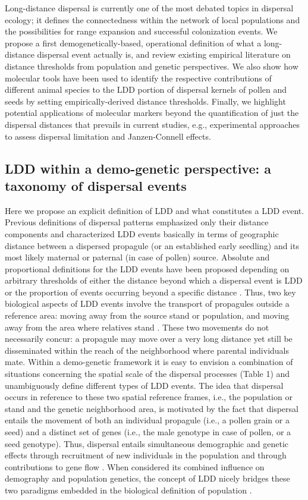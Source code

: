 \documentclass[a4paper, 12pt]{article}
\begin{document}
\begin{linenumbers}
Long-distance dispersal is currently one of the most debated topics in dispersal ecology; it defines the connectedness within the network of local populations and the possibilities for range expansion and successful colonization events. We propose a first demogenetically-based, operational definition of what a long-distance dispersal event actually is, and review existing empirical literature on distance thresholds from population and genetic perspectives. We also show how molecular tools have been used to identify the respective contributions of different animal species to the LDD portion of dispersal kernels of pollen and seeds by setting empirically-derived distance thresholds. Finally, we highlight potential applications of molecular markers beyond the quantification of just the dispersal distances that prevails in current studies, e.g., experimental approaches to assess dispersal limitation and Janzen-Connell effects.

\subsection*{LDD within a demo-genetic perspective: a taxonomy of dispersal events}

Here we propose an explicit definition of LDD and what constitutes a LDD event. Previous definitions of dispersal patterns emphasized only their distance components and characterized LDD events basically in terms of geographic distance between a dispersed propagule (or an established early seedling) and its most likely maternal or paternal (in case of pollen) source. Absolute and proportional definitions for the LDD events have been proposed depending on arbitrary thresholds of either the distance beyond which a dispersal event is LDD or the proportion of events occurring beyond a specific distance \citep{Nathan:2005jc, Nathan:2008is}. Thus, two key biological aspects of LDD events involve the transport of propagules outside a reference area: moving away from the source stand or population, and moving away from the area where relatives stand \citep{Kinlan:2005fb}. These two movements do not necessarily concur: a propagule may move over a very long distance yet still be disseminated within the reach of the neighborhood where parental individuals mate. Within a demo-genetic framework it is easy to envision a combination of situations concerning the spatial scale of the dispersal processes (Table 1) and unambiguously define different types of LDD events. The idea that dispersal occurs in reference to these two spatial reference frames, i.e., the population or stand and the genetic neighborhood area, is motivated by the fact that dispersal entails the movement of both an individual propagule (i.e., a pollen grain or a seed) and a distinct set of genes (i.e., the male genotype in case of pollen, or a seed genotype). Thus, dispersal entails simultaneous demographic and genetic effects through recruitment of new individuals in the population and through contributions to gene flow \citep{Harper:1977aa}. When considered its combined influence on demography and population genetics, the concept of LDD nicely bridges these two paradigms embedded in the biological definition of population \citep{Waples:2006ev}. 
 

\end{linenumbers}
\end{document}
